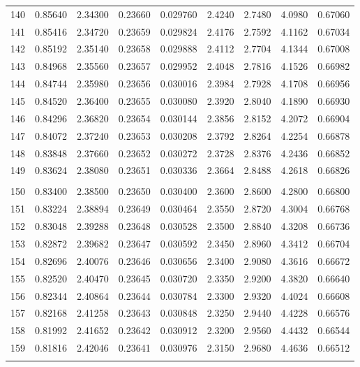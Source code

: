 \documentclass[letter,twosides,10pt]{article}
\begin{document}
\begin{longtable}{|c|c|c|c|c|c|c|c|c|}
140 & 0.85640 & 2.34300 & 0.23660 & 0.029760 & 2.4240 & 2.7480 & 4.0980 & 0.67060 \\
141 & 0.85416 & 2.34720 & 0.23659 & 0.029824 & 2.4176 & 2.7592 & 4.1162 & 0.67034 \\
142 & 0.85192 & 2.35140 & 0.23658 & 0.029888 & 2.4112 & 2.7704 & 4.1344 & 0.67008 \\
143 & 0.84968 & 2.35560 & 0.23657 & 0.029952 & 2.4048 & 2.7816 & 4.1526 & 0.66982 \\
144 & 0.84744 & 2.35980 & 0.23656 & 0.030016 & 2.3984 & 2.7928 & 4.1708 & 0.66956 \\
145 & 0.84520 & 2.36400 & 0.23655 & 0.030080 & 2.3920 & 2.8040 & 4.1890 & 0.66930 \\
146 & 0.84296 & 2.36820 & 0.23654 & 0.030144 & 2.3856 & 2.8152 & 4.2072 & 0.66904 \\
147 & 0.84072 & 2.37240 & 0.23653 & 0.030208 & 2.3792 & 2.8264 & 4.2254 & 0.66878 \\
148 & 0.83848 & 2.37660 & 0.23652 & 0.030272 & 2.3728 & 2.8376 & 4.2436 & 0.66852 \\
149 & 0.83624 & 2.38080 & 0.23651 & 0.030336 & 2.3664 & 2.8488 & 4.2618 & 0.66826 \\
 & & & & & & & & \\
150 & 0.83400 & 2.38500 & 0.23650 & 0.030400 & 2.3600 & 2.8600 & 4.2800 & 0.66800 \\
151 & 0.83224 & 2.38894 & 0.23649 & 0.030464 & 2.3550 & 2.8720 & 4.3004 & 0.66768 \\
152 & 0.83048 & 2.39288 & 0.23648 & 0.030528 & 2.3500 & 2.8840 & 4.3208 & 0.66736 \\
153 & 0.82872 & 2.39682 & 0.23647 & 0.030592 & 2.3450 & 2.8960 & 4.3412 & 0.66704 \\
154 & 0.82696 & 2.40076 & 0.23646 & 0.030656 & 2.3400 & 2.9080 & 4.3616 & 0.66672 \\
155 & 0.82520 & 2.40470 & 0.23645 & 0.030720 & 2.3350 & 2.9200 & 4.3820 & 0.66640 \\
156 & 0.82344 & 2.40864 & 0.23644 & 0.030784 & 2.3300 & 2.9320 & 4.4024 & 0.66608 \\
157 & 0.82168 & 2.41258 & 0.23643 & 0.030848 & 2.3250 & 2.9440 & 4.4228 & 0.66576 \\
158 & 0.81992 & 2.41652 & 0.23642 & 0.030912 & 2.3200 & 2.9560 & 4.4432 & 0.66544 \\
159 & 0.81816 & 2.42046 & 0.23641 & 0.030976 & 2.3150 & 2.9680 & 4.4636 & 0.66512 \\
 & & & & & & & & \\

\end{longtable}
\end{document}
